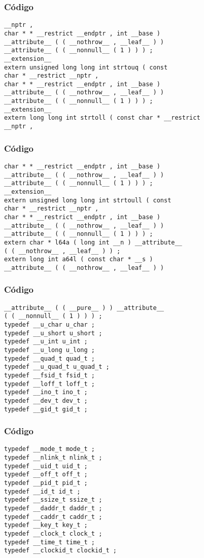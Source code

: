\documentclass{beamer}
\begin{document}
\begin{frame}[fragile]
\frametitle{C\'odigo}
\begin{verbatim}
__nptr , 
char * * __restrict __endptr , int __base ) 
__attribute__ ( ( __nothrow__ , __leaf__ ) ) 
__attribute__ ( ( __nonnull__ ( 1 ) ) ) ; 
__extension__ 
extern unsigned long long int strtouq ( const 
char * __restrict __nptr , 
char * * __restrict __endptr , int __base ) 
__attribute__ ( ( __nothrow__ , __leaf__ ) ) 
__attribute__ ( ( __nonnull__ ( 1 ) ) ) ; 
__extension__ 
extern long long int strtoll ( const char * __restrict 
__nptr , 
\end{verbatim}
\end{frame}
\begin{frame}[fragile]
\frametitle{C\'odigo}
\begin{verbatim}
char * * __restrict __endptr , int __base ) 
__attribute__ ( ( __nothrow__ , __leaf__ ) ) 
__attribute__ ( ( __nonnull__ ( 1 ) ) ) ; 
__extension__ 
extern unsigned long long int strtoull ( const 
char * __restrict __nptr , 
char * * __restrict __endptr , int __base ) 
__attribute__ ( ( __nothrow__ , __leaf__ ) ) 
__attribute__ ( ( __nonnull__ ( 1 ) ) ) ; 
extern char * l64a ( long int __n ) __attribute__ 
( ( __nothrow__ , __leaf__ ) ) ; 
extern long int a64l ( const char * __s ) 
__attribute__ ( ( __nothrow__ , __leaf__ ) ) 
\end{verbatim}
\end{frame}
\begin{frame}[fragile]
\frametitle{C\'odigo}
\begin{verbatim}
__attribute__ ( ( __pure__ ) ) __attribute__ 
( ( __nonnull__ ( 1 ) ) ) ; 
typedef __u_char u_char ; 
typedef __u_short u_short ; 
typedef __u_int u_int ; 
typedef __u_long u_long ; 
typedef __quad_t quad_t ; 
typedef __u_quad_t u_quad_t ; 
typedef __fsid_t fsid_t ; 
typedef __loff_t loff_t ; 
typedef __ino_t ino_t ; 
typedef __dev_t dev_t ; 
typedef __gid_t gid_t ; 
\end{verbatim}
\end{frame}
\begin{frame}[fragile]
\frametitle{C\'odigo}
\begin{verbatim}
typedef __mode_t mode_t ; 
typedef __nlink_t nlink_t ; 
typedef __uid_t uid_t ; 
typedef __off_t off_t ; 
typedef __pid_t pid_t ; 
typedef __id_t id_t ; 
typedef __ssize_t ssize_t ; 
typedef __daddr_t daddr_t ; 
typedef __caddr_t caddr_t ; 
typedef __key_t key_t ; 
typedef __clock_t clock_t ; 
typedef __time_t time_t ; 
typedef __clockid_t clockid_t ; 
\end{verbatim}
\end{frame}
\end{document}
